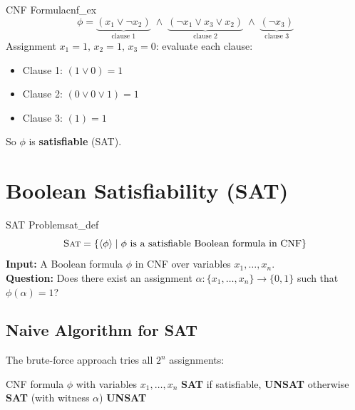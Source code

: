 \documentclass[12pt,a4paper]{article}
\newcommand{\SAT}{\textsc{Sat}}
\newcommand{\enc}[1]{\langle #1 \rangle}
\begin{document}
\begin{example}{CNF Formula}{cnf_ex}
\[
  \phi = \underbrace{(x_1 \lor \neg x_2)}_{\text{clause 1}} 
       \;\land\; 
       \underbrace{(\neg x_1 \lor x_3 \lor x_2)}_{\text{clause 2}} 
       \;\land\;
       \underbrace{(\neg x_3)}_{\text{clause 3}}
\]
Assignment $x_1 = 1,\, x_2 = 1,\, x_3 = 0$: evaluate each clause:
\begin{itemize}[leftmargin=2em]
  \item Clause 1: $(1 \lor 0) = 1$ \checkmark
  \item Clause 2: $(0 \lor 0 \lor 1) = 1$ \checkmark
  \item Clause 3: $(1) = 1$ \checkmark
\end{itemize}
So $\phi$ is \textbf{satisfiable} (SAT).
\end{example}

\newpage

\section{Boolean Satisfiability (SAT)}

\begin{definition}{SAT Problem}{sat_def}
\[
  \SAT = \{ \enc{\phi} \mid \phi \text{ is a satisfiable Boolean formula in CNF} \}
\]
\textbf{Input:} A Boolean formula $\phi$ in CNF over variables $x_1, \ldots, x_n$.\\
\textbf{Question:} Does there exist an assignment $\alpha: \{x_1,\ldots,x_n\} \to \{0,1\}$ 
such that $\phi(\alpha) = 1$?
\end{definition}

\subsection{Naive Algorithm for SAT}

The brute-force approach tries all $2^n$ assignments:

\begin{algorithm}[H]
\caption{Brute-Force SAT Solver}
\begin{algorithmic}[1]
\Require CNF formula $\phi$ with variables $x_1, \ldots, x_n$
\Ensure \textbf{SAT} if satisfiable, \textbf{UNSAT} otherwise
   
    \State \Return \textbf{SAT} (with witness $\alpha$)
  \EndIf
\EndFor
\State \Return \textbf{UNSAT}
\end{algorithmic}
\end{algorithm}
\end{document}
